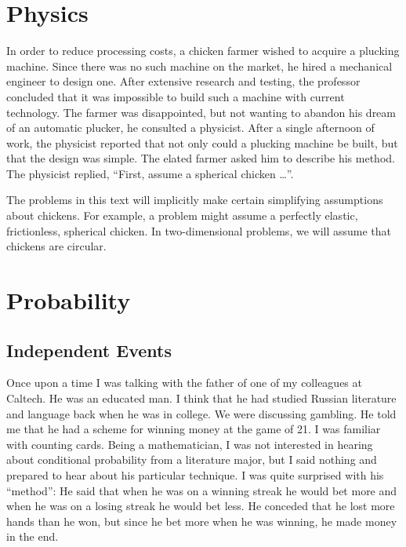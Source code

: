 \raggedbottom
\chapter{Physics}
\label{chapter spherical chicken}
\flushbottom


In order to reduce processing costs, a chicken farmer wished to acquire
a plucking machine.  Since there was no such machine on the market, 
he hired a mechanical engineer to design one.  After extensive
research and testing, the professor concluded that it was impossible to 
build such a machine with current technology.  The farmer was disappointed,
but not wanting to abandon his dream of an automatic plucker, he consulted
a physicist.  After a single afternoon of work, the physicist reported 
that not only could a plucking machine be built, but that the design 
was simple.  The elated farmer asked him to describe his method.
The physicist replied, ``First, assume a spherical chicken \ldots''.

The problems in this text will implicitly make certain simplifying 
assumptions about chickens.  For example, a problem might assume 
a perfectly elastic, frictionless, spherical chicken.  In two-dimensional
problems, we will assume that chickens are circular.





\raggedbottom
\chapter{Probability}
\flushbottom




\section{Independent Events}

Once upon a time I was talking with the father of one of my colleagues
at Caltech.  He was an educated man.  I think that he had studied
Russian literature and language back when he was in college.  We were
discussing gambling.  He told me that he had a scheme for winning money
at the game of 21.  I was familiar with counting cards.  Being a mathematician,
I was not interested in hearing about conditional probability from a 
literature major, but I said nothing and prepared to hear about his particular 
technique.  I was quite surprised with his ``method'':  He said that when he 
was on a winning streak he would bet more and when he was on a losing streak
he would bet less.  He conceded that he lost more hands than he won, 
but since he bet more when he was winning, he made money in the end.  

